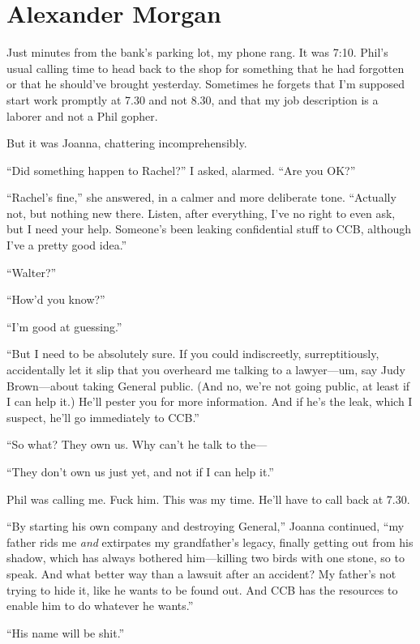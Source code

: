 \chapter{Alexander Morgan}

\titlemark

Just minutes from the bank's parking lot, my phone rang. It was 7:10.
Phil's usual calling time to head back to the shop for something that he
had forgotten or that he should've brought yesterday. Sometimes he
forgets that I'm supposed start work promptly at 7.30 and not 8.30, and
that my job description is a laborer and not a Phil gopher.

But it was Joanna, chattering incomprehensibly.

``Did something happen to Rachel?'' I asked, alarmed. ``Are you OK?''

``Rachel's fine,'' she answered, in a calmer and more deliberate tone.
``Actually not, but nothing new there. Listen, after everything, I've no
right to even ask, but I need your help. Someone's been leaking
confidential stuff to CCB, although I've a pretty good idea.''

``Walter?''

``How'd you know?''

``I'm good at guessing.''

``But I need to be absolutely sure. If you could indiscreetly,
surreptitiously, accidentally let it slip that you overheard me talking
to a lawyer---um, say Judy Brown---about taking General public. (And no,
we're not going public, at least if I can help it.) He'll pester you for
more information. And if he's the leak, which I suspect, he'll go
immediately to CCB.''

``So what? They own us. Why can't he talk to the---

``They don't own us just yet, and not if I can help it.''

Phil was calling me. Fuck him. This was my time. He'll have to call back
at 7.30.

``By starting his own company and destroying General,'' Joanna
continued, ``my father rids me \emph{and} extirpates my grandfather's
legacy, finally getting out from his shadow, which has always bothered
him---killing two birds with one stone, so to speak. And what better way
than a lawsuit after an accident? My father's not trying to hide it,
like he wants to be found out. And CCB has the resources to enable him
to do whatever he wants.''

``His name will be shit.''

